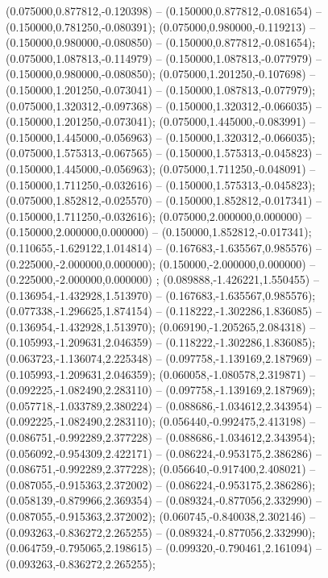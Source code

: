  (0.075000,0.877812,-0.120398) -- (0.150000,0.877812,-0.081654) -- (0.150000,0.781250,-0.080391);
 (0.075000,0.980000,-0.119213) -- (0.150000,0.980000,-0.080850) -- (0.150000,0.877812,-0.081654);
 (0.075000,1.087813,-0.114979) -- (0.150000,1.087813,-0.077979) -- (0.150000,0.980000,-0.080850);
 (0.075000,1.201250,-0.107698) -- (0.150000,1.201250,-0.073041) -- (0.150000,1.087813,-0.077979);
 (0.075000,1.320312,-0.097368) -- (0.150000,1.320312,-0.066035) -- (0.150000,1.201250,-0.073041);
 (0.075000,1.445000,-0.083991) -- (0.150000,1.445000,-0.056963) -- (0.150000,1.320312,-0.066035);
 (0.075000,1.575313,-0.067565) -- (0.150000,1.575313,-0.045823) -- (0.150000,1.445000,-0.056963);
 (0.075000,1.711250,-0.048091) -- (0.150000,1.711250,-0.032616) -- (0.150000,1.575313,-0.045823);
 (0.075000,1.852812,-0.025570) -- (0.150000,1.852812,-0.017341) -- (0.150000,1.711250,-0.032616);
 (0.075000,2.000000,0.000000) -- (0.150000,2.000000,0.000000) -- (0.150000,1.852812,-0.017341);
 (0.110655,-1.629122,1.014814) -- (0.167683,-1.635567,0.985576) -- (0.225000,-2.000000,0.000000);
 (0.150000,-2.000000,0.000000) -- (0.225000,-2.000000,0.000000) ;
 (0.089888,-1.426221,1.550455) -- (0.136954,-1.432928,1.513970) -- (0.167683,-1.635567,0.985576);
 (0.077338,-1.296625,1.874154) -- (0.118222,-1.302286,1.836085) -- (0.136954,-1.432928,1.513970);
 (0.069190,-1.205265,2.084318) -- (0.105993,-1.209631,2.046359) -- (0.118222,-1.302286,1.836085);
 (0.063723,-1.136074,2.225348) -- (0.097758,-1.139169,2.187969) -- (0.105993,-1.209631,2.046359);
 (0.060058,-1.080578,2.319871) -- (0.092225,-1.082490,2.283110) -- (0.097758,-1.139169,2.187969);
 (0.057718,-1.033789,2.380224) -- (0.088686,-1.034612,2.343954) -- (0.092225,-1.082490,2.283110);
 (0.056440,-0.992475,2.413198) -- (0.086751,-0.992289,2.377228) -- (0.088686,-1.034612,2.343954);
 (0.056092,-0.954309,2.422171) -- (0.086224,-0.953175,2.386286) -- (0.086751,-0.992289,2.377228);
 (0.056640,-0.917400,2.408021) -- (0.087055,-0.915363,2.372002) -- (0.086224,-0.953175,2.386286);
 (0.058139,-0.879966,2.369354) -- (0.089324,-0.877056,2.332990) -- (0.087055,-0.915363,2.372002);
 (0.060745,-0.840038,2.302146) -- (0.093263,-0.836272,2.265255) -- (0.089324,-0.877056,2.332990);
 (0.064759,-0.795065,2.198615) -- (0.099320,-0.790461,2.161094) -- (0.093263,-0.836272,2.265255);
